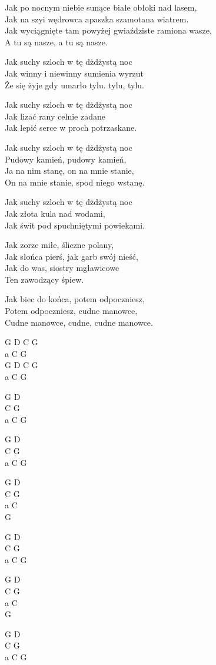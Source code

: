 \begin{text}
    Jak po nocnym niebie sunące białe obłoki nad lasem,\\
    Jak na szyi wędrowca apaszka szamotana wiatrem.\\
    Jak wyciągnięte tam powyżej gwiaździste ramiona wasze,\\
    A tu są nasze, a tu są nasze.

    Jak suchy szloch w tę dżdżystą noc\\
    Jak winny i niewinny sumienia wyrzut\\
    Że się żyje gdy umarło tylu. tylu, tylu.

    Jak suchy szloch w tę dżdżystą noc\\
    Jak lizać rany celnie zadane\\
    Jak lepić serce w proch potrzaskane.

    Jak suchy szloch w tę dżdżystą noc\\
    Pudowy kamień, pudowy kamień,\\
    Ja na nim stanę, on na mnie stanie,\\
    On na mnie stanie, spod niego wstanę.

    Jak suchy szloch w tę dżdżystą noc\\
    Jak złota kula nad wodami,\\
    Jak świt pod spuchniętymi powiekami.

    Jak zorze miłe, śliczne polany,\\
    Jak słońca pierś, jak garb swój nieść,\\
    Jak do was, siostry mgławicowe\\
    Ten zawodzący śpiew.

    Jak biec do końca, potem odpoczniesz,\\
    Potem odpoczniesz, cudne manowce,\\
    Cudne manowce, cudne, cudne manowce.
\end{text}
\begin{chord}
    G D C G\\
    a C G\\
    G D C G\\
    a C G

    G D\\
    C G\\
    a C G
    
    G D\\
    C G\\
    a C G
    
    G D\\
    C G\\
    a C\\
    G
    
    G D\\
    C G\\
    a C G
    
    G D\\
    C G\\
    a C\\
    G
    
    G D\\
    C G\\
    a C G
\end{chord}

